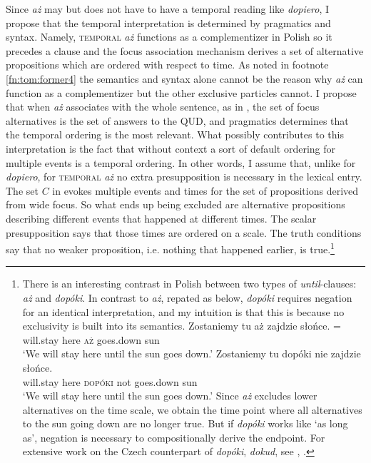 \documentclass[output=paper,colorlinks,citecolor=brown]{langscibook}
\begin{document}
\noindent Since \textit{aż} may but does not have to have a temporal reading like \textit{dopiero}, I propose that the temporal interpretation is determined by pragmatics and syntax. Namely, \textsc{temporal} \textit{aż} functions as a complementizer in Polish so it precedes a clause and the focus association mechanism derives a set of alternative propositions which are ordered with respect to time. As noted in footnote \ref{fn:tom:former4} the semantics and syntax alone cannot be the reason why \textit{aż} can function as a complementizer but the other exclusive particles cannot. I propose that when \textit{aż} associates with the whole sentence, as in , the set of focus alternatives is the set of answers to the QUD, and pragmatics determines that the temporal ordering is the most relevant. What possibly contributes to this interpretation is the fact that without context a sort of default ordering for multiple events is a temporal ordering. In other words, I assume that, unlike for \textit{dopiero}, for \textsc{temporal} \textit{aż} no extra presupposition is necessary in the lexical entry. The set $C$ in  evokes multiple events and times for the set of propositions derived from wide focus. So what ends up being excluded are alternative propositions describing different events that happened at different times. The scalar presupposition says that those times are ordered on a scale. The truth conditions say that no weaker proposition, i.e. nothing that happened earlier, is true.\footnote{There is an interesting contrast in Polish between two types of \textit{until}-clauses: \textit{aż} and \textit{dopóki}. In contrast to \textit{aż},  repated as  below, \textit{dopóki} requires negation for an identical interpretation,  and my intuition is that this is because no exclusivity is built into its semantics. 
\ea\label{ex:tom:foot}
\ea\label{ex:tom:foota} 
\gll Zostaniemy tu aż zajdzie słońce. = \\
will.stay here \textsc{aż} goes.down sun\\
\glt `We will stay here until the sun goes down.’
\ex\label{ex:tom:footb} 
\gll Zostaniemy tu dopóki nie zajdzie słońce. \\
will.stay here \textsc{dopóki} not goes.down sun\\
\glt `We will stay here until the sun goes down.’
\z 
\z 
Since \textit{aż} excludes lower alternatives on the time scale, we obtain the time point where all alternatives to the sun going down are no longer true. But if \textit{dopóki} works like ‘as long as’, negation is necessary to compositionally derive the endpoint. For extensive work on the Czech counterpart of \textit{dopóki}, \textit{dokud}, see \citet{docekal12a,docekal15}, \citet{iatridouzeijlstra21}.
}
\end{document}
